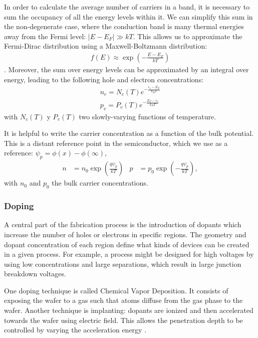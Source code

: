 In order to calculate the average number of carriers in a band,
it is necessary to sum the occupancy of all the energy levels within it.
We can simplify this sum in the non-degenerate case, where
the conduction band is many thermal energies away from the Fermi level:
$|E-E_F| \gg kT$.
This allows us to approximate the Fermi-Dirac distribution using a
Maxwell-Boltzmann distribution:
\begin{align*}
    f(E) \approx \exp\left(-\frac{E-E_F}{kT}\right)
\end{align*}.
Moreover, the sum over energy levels can be approximated by an integral
over energy, leading to the following hole and electron concentrations:
\begin{align*}
    n_c = N_c(T)e^{-\frac{\epsilon_c-E_F}{k_BT}}\\
    p_v = P_v(T)e^{-\frac{E_F-\epsilon_v}{k_BT}}
\end{align*} with $N_c(T)$ y $P_v(T)$ two slowly-varying functions of temperature.

It is helpful to write the carrier concentration as a function of the bulk potential.
This is a distant reference point in the semiconductor, which we use as a reference:
$\psi_p=\phi(x)-\phi(\infty)$,
\begin{align}
    n &= n_0\exp\left(\frac{q\psi_p}{kT}\right)&
    p &= p_0\exp\left(-\frac{q\psi_p}{kT}\right),
    \label{eq:portadores_nodegenerados}
\end{align}
with $n_0$ and $p_0$ the bulk carrier concentrations.
\subsubsection{Doping}
A central part of the fabrication process is the introduction of dopants
which increase the number of holes or electrons in specific regions.
The geometry and dopant concentration of each region define what kinds of devices
can be created in a given process.
For example, a process might be designed for high voltages by using low concentrations
and large separations, which result in large junction breakdown voltages.

One doping technique is called Chemical Vapor Deposition.
It consists of exposing the wafer to a gas such that atoms diffuse from
the gas phase to the wafer.
Another technique is implanting: dopants are ionized and then accelerated
towards the wafer using electric field.
This allows the penetration depth to be controlled by varying the
acceleration energy
\cite{campbell_science_2001}.

